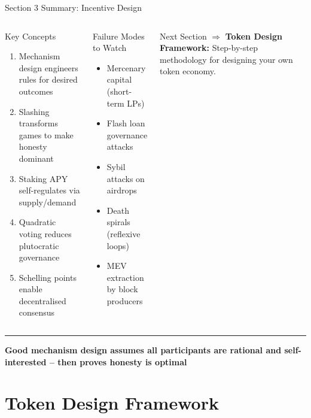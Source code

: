 \documentclass[8pt,aspectratio=169]{beamer}
\newcommand{\bottomnote}[1]{\vfill\vspace{-2mm}\textcolor{mllavender2}{\rule{\textwidth}{0.4pt}}\vspace{1mm}\footnotesize\textbf{#1}}
\begin{document}
\begin{frame}{Section 3 Summary: Incentive Design}
\begin{columns}[T]
\begin{block}{Key Concepts}
\footnotesize
\begin{enumerate}
  \item Mechanism design engineers rules for desired outcomes
  \item Slashing transforms games to make honesty dominant
  \item Staking APY self-regulates via supply/demand
  \item Quadratic voting reduces plutocratic governance
  \item Schelling points enable decentralised consensus
\end{enumerate}
\end{block}

\begin{block}{Failure Modes to Watch}
\footnotesize
\begin{itemize}
  \item[\textcolor{mlred}{\textbullet}] Mercenary capital (short-term LPs)
  \item[\textcolor{mlred}{\textbullet}] Flash loan governance attacks
  \item[\textcolor{mlred}{\textbullet}] Sybil attacks on airdrops
  \item[\textcolor{mlred}{\textbullet}] Death spirals (reflexive loops)
  \item[\textcolor{mlred}{\textbullet}] MEV extraction by block producers
\end{itemize}
\end{block}
\vspace{2mm}
\begin{exampleblock}{\footnotesize Next Section}
\footnotesize
$\Rightarrow$ \textbf{Token Design Framework:} Step-by-step methodology for designing your own token economy.
\end{exampleblock}
\end{columns}
\bottomnote{Good mechanism design assumes all participants are rational and self-interested -- then proves honesty is optimal}
\end{frame}

\section{Token Design Framework}
\end{document}
